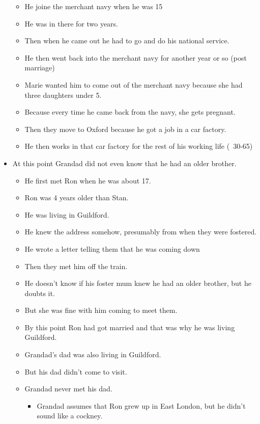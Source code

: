 \documentclass[10pt,twocolumn,letterpaper]{article}
\begin{document}
\begin{itemize}
\begin{itemize}
\begin{itemize}
        \end{itemize}
        \item He joine the merchant navy when he was 15
        \item He was in there for two years.
        \item Then when he came out he had to go and do his national service.
        \item He then went back into the merchant navy for another year or so (post marriage)
        \item Marie wanted him to come out of the merchant navy because she had three daughters under 5.
        \item Because every time he came back from the navy, she gets pregnant.
        \item Then they move to Oxford because he got a job in a car factory.
        \item He then works in that car factory for the rest of his working life (~30-65)
    \end{itemize}
    \item At this point Grandad did not even know that he had an older brother. 
    \begin{itemize}
        \item He first met Ron when he was about 17.
        \item Ron was 4 years older than Stan.
        \item He was living in Guildford.
        \item He knew the address somehow, presumably from when they were fostered.
        \item He wrote a letter telling them that he was coming down
        \item Then they met him off the train.
        \item He doesn't know if his foster mum knew he had an older brother, but he doubts it.
        \item But she was fine with him coming to meet them.
        \item By this point Ron had got married and that was why he was living Guildford.
        \item Grandad's dad was also living in Guildford.
        \item But his dad didn't come to visit.
        \item Grandad never met his dad.
        \begin{itemize}
            \item Grandad assumes that Ron grew up in East London, but he didn't sound like a cockney.

\end{itemize}
\end{itemize}
\end{itemize}
\end{document}
